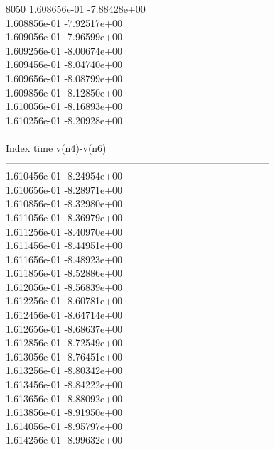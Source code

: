 8050	1.608656e-01	-7.88428e+00	\\ 	1.608856e-01	-7.92517e+00	\\ 	1.609056e-01	-7.96599e+00	\\ 	1.609256e-01	-8.00674e+00	\\ 	1.609456e-01	-8.04740e+00	\\ 	1.609656e-01	-8.08799e+00	\\ 	1.609856e-01	-8.12850e+00	\\ 	1.610056e-01	-8.16893e+00	\\ 	1.610256e-01	-8.20928e+00	\\ \hline
\\ \hline
Index   time            v(n4)-v(n6)     \\ \hline
--------------------------------------------------------------------------------\\ 	1.610456e-01	-8.24954e+00	\\ 	1.610656e-01	-8.28971e+00	\\ 	1.610856e-01	-8.32980e+00	\\ 	1.611056e-01	-8.36979e+00	\\ 	1.611256e-01	-8.40970e+00	\\ 	1.611456e-01	-8.44951e+00	\\ 	1.611656e-01	-8.48923e+00	\\ 	1.611856e-01	-8.52886e+00	\\ 	1.612056e-01	-8.56839e+00	\\ 	1.612256e-01	-8.60781e+00	\\ 	1.612456e-01	-8.64714e+00	\\ 	1.612656e-01	-8.68637e+00	\\ 	1.612856e-01	-8.72549e+00	\\ 	1.613056e-01	-8.76451e+00	\\ 	1.613256e-01	-8.80342e+00	\\ 	1.613456e-01	-8.84222e+00	\\ 	1.613656e-01	-8.88092e+00	\\ 	1.613856e-01	-8.91950e+00	\\ 	1.614056e-01	-8.95797e+00	\\ 	1.614256e-01	-8.99632e+00	\\ \hline
